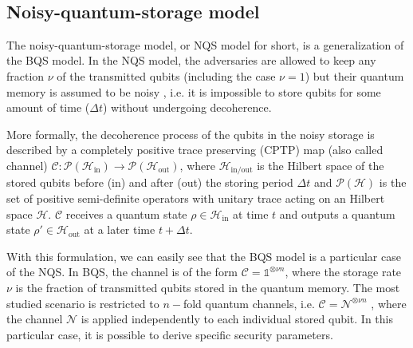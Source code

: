 \

\subsection{Noisy-quantum-storage model}

The noisy-quantum-storage model, or NQS model for short, is a generalization of the BQS model. In the NQS model, the adversaries are allowed to keep any fraction $\nu$ of the transmitted qubits (including the case $\nu=1$) but their quantum memory is assumed to be noisy \cite{KWW12}, i.e. it is impossible to store qubits for some amount of time ($\Delta t$) without undergoing decoherence. 

More formally, the decoherence process of the qubits in the noisy storage is described by a completely positive trace preserving (CPTP) map (also called channel) $\mathcal{C}: \mathcal{P}(\mathcal{H}_{\text{in}})\rightarrow \mathcal{P}(\mathcal{H}_{\text{out}})$, where $\mathcal{H}_{\text{in/out}}$ is the Hilbert space of the stored qubits before (in) and after (out) the storing period $\Delta t$ and $\mathcal{P}(\mathcal{H})$ is the set of positive semi-definite operators with unitary trace acting on an Hilbert space $\mathcal{H}$. $\mathcal{C}$ receives a quantum state $\rho\in \mathcal{H}_{\text{in}}$ at time $t$ and outputs a quantum state $\rho'\in\mathcal{H}_{\text{out}}$ at a later time $t + \Delta t$. %

With this formulation, we can easily see that the BQS model is a particular case of the NQS. In BQS, the channel is of the form $\mathcal{C} = \mathds{1}^{\otimes \nu n}$, where the storage rate $\nu$ is the fraction of transmitted qubits stored in the quantum memory. The most studied scenario is restricted to $n-$fold quantum channels, i.e. $\mathcal{C} = \mathcal{N}^{\otimes \nu n}$ \cite{S10, KWW12, WST08}, where the channel $\mathcal{N}$ is applied independently to each individual stored qubit. In this particular case, it is possible to derive specific security parameters.


